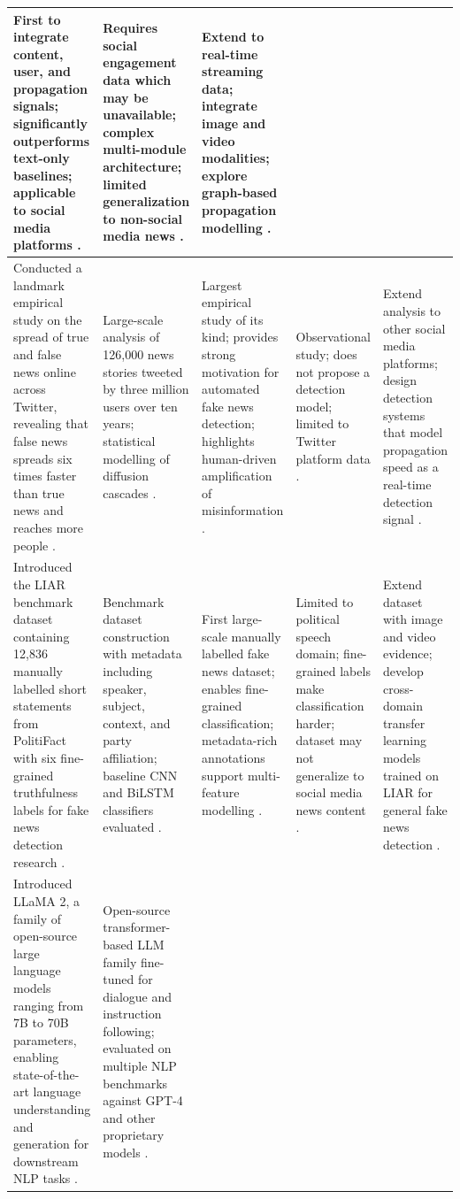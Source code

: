 \begin{longtable}{|p{}|p{}|p{}|p{}|p{}|}
First to integrate content, user, and propagation signals; significantly outperforms text-only baselines; applicable to social media platforms \cite{Ruchansky2017CSI}. &
Requires social engagement data which may be unavailable; complex multi-module architecture; limited generalization to non-social media news \cite{Ruchansky2017CSI}. &
Extend to real-time streaming data; integrate image and video modalities; explore graph-based propagation modelling \cite{Ruchansky2017CSI}. \\ \hline
Conducted a landmark empirical study on the spread of true and false news online across Twitter, revealing that false news spreads six times faster than true news and reaches more people \cite{Vosoughi2018Spread}. &
Large-scale analysis of 126,000 news stories tweeted by three million users over ten years; statistical modelling of diffusion cascades \cite{Vosoughi2018Spread}. &
Largest empirical study of its kind; provides strong motivation for automated fake news detection; highlights human-driven amplification of misinformation \cite{Vosoughi2018Spread}. &
Observational study; does not propose a detection model; limited to Twitter platform data \cite{Vosoughi2018Spread}. &
Extend analysis to other social media platforms; design detection systems that model propagation speed as a real-time detection signal \cite{Vosoughi2018Spread}. \\ \hline
Introduced the LIAR benchmark dataset containing 12,836 manually labelled short statements from PolitiFact with six fine-grained truthfulness labels for fake news detection research \cite{Wang2017Liar}. &
Benchmark dataset construction with metadata including speaker, subject, context, and party affiliation; baseline CNN and BiLSTM classifiers evaluated \cite{Wang2017Liar}. &
First large-scale manually labelled fake news dataset; enables fine-grained classification; metadata-rich annotations support multi-feature modelling \cite{Wang2017Liar}. &
Limited to political speech domain; fine-grained labels make classification harder; dataset may not generalize to social media news content \cite{Wang2017Liar}. &
Extend dataset with image and video evidence; develop cross-domain transfer learning models trained on LIAR for general fake news detection \cite{Wang2017Liar}. \\ \hline
Introduced LLaMA 2, a family of open-source large language models ranging from 7B to 70B parameters, enabling state-of-the-art language understanding and generation for downstream NLP tasks \cite{Touvron2023Llama2}. &
Open-source transformer-based LLM family fine-tuned for dialogue and instruction following; evaluated on multiple NLP benchmarks against GPT-4 and other proprietary models \cite{Touvron2023Llama2}. &

\end{longtable}
